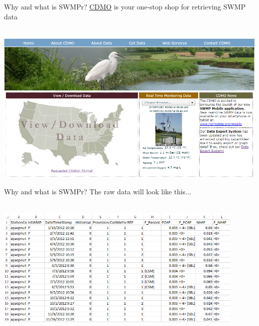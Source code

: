 \documentclass[xcolor=dvipsnames,serif]{beamer}\usepackage[]{graphicx}\usepackage[]{color}
\begin{document}
\begin{frame}[t]{Why and what is SWMPr?}
\href{http://cdmo.baruch.sc.edu/}{CDMO} is your one-stop shop for retrieving SWMP data \\~\\
\centerline{\includegraphics[width = \textwidth]{imgs/cdmo_front.png}}
\end{frame}

\begin{frame}{Why and what is SWMPr?}
The raw data will look like this...\\~\\
\centerline{\includegraphics[width = 0.9\textwidth]{imgs/qaqc_ex.png}}
\end{frame}
\end{document}
